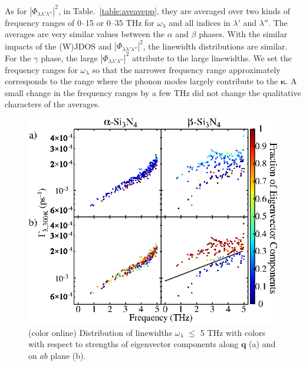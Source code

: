 \documentclass[twocolumn,amsmath,amssymb,a4paper,prb,superscriptaddress,floatfix]{revtex4-1}
\begin{document}
As for $|\Phi_{\lambda\lambda'\lambda''}|^2$, in Table.~\ref{table:aveavepp},
they are averaged over two kinds of frequency ranges of 0--15 or 0--35 THz for
$\omega_\lambda$ and all indices in $\lambda'$ and $\lambda''$.  The averages
are very similar values between the $\alpha$ and $\beta$ phases. With the
similar impacts of the (W)JDOS and $|\Phi_{\lambda\lambda'\lambda''}|^2$, the
linewidth distributions are similar.  For the $\gamma$ phase, the large
$|\Phi_{\lambda\lambda'\lambda''}|^2$ attribute to the large linewidths.  We set
the frequency ranges for $\omega_\lambda$ so that the narrower frequency range
approximately corresponds to the range where the phonon modes largely contribute
to the $\boldsymbol{\kappa}$. A small change in the frequency ranges by a few
THz did not change the qualitative characters of the averages.  

\begin{figure}[ht]
 \centering
  \includegraphics[width=\linewidth]{figure_analyze_gamma3_m1010_print.eps} \caption{(color
	  online) Distribution of linewidths $\omega_\lambda$ $\leq$ 5 THz
		  with colors with respect to strengths of eigenvector components along $\mathbf q$ (a)
		  and on $ab$ plane (b).} \label{fig:Fig7_338} 
 \centering
\end{figure}
\end{document}
